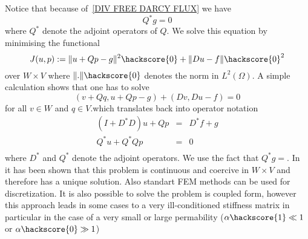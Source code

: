 Notice that because of~\ref{DIV FREE DARCY FLUX} we have
\begin{equation} \label{ABSTRACT DIV FREE DARCY FLUX}
Q^*g =0
\end{equation}
where $Q^*$ denote the adjoint operators of $Q$.
We solve this equation by minimising the functional
\begin{equation}
J(u,p):=\|u + Qp - g\|^2\hackscore{0} + \|Du-f\|\hackscore{0}^2 
\end{equation} 
over $W \times V$ where $\|.\|\hackscore{0}$ denotes the norm in $L^2(\Omega)$. A simple calculation shows that
one has to solve
\begin{equation}
( v + Qq , u + Qp - g) + (Dv,Du-f) =0 
\end{equation} 
for all $v\in W$ and $q \in V$.which translates back into operator notation
\begin{equation}
\begin{array}{rcl}
(I+D^*D)u + Qp & = & D^*f + g \\
Q^*u  + Q^*Q p & = & 0 \\ 
\end{array}
\end{equation} 
where $D^*$ and $Q^*$ denote the adjoint operators. We use the fact that $Q^*g=$. 
In~\cite{XXX} it has been shown that this problem is continuous and coercive in $W \times V$ and therefore has a unique solution. Also standart FEM methods can be used for discretization. It is also possible 
to solve the problem is coupled form, however this approach leads in some cases to a very ill-conditioned stiffness matrix in particular in the case of a very small or large permability ($\alpha\hackscore{1} \ll 1$ or $\alpha\hackscore{0} \gg 1$)  

